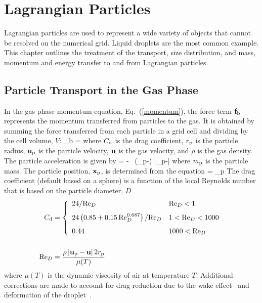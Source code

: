 

\chapter{Lagrangian Particles}
\label{chapter:lagrangian_particles}

Lagrangian particles are used to represent a wide variety of objects that cannot be resolved on
the numerical grid. Liquid droplets are the most common example. This chapter outlines the treatment of the transport, size
distribution, and mass, momentum and energy transfer to and from Lagrangian particles.

\section{Particle Transport in the Gas Phase}

In the gas phase momentum equation, Eq.~(\ref{momentum}), the force term ${\mathbf{f}}_{\rm b}$ represents the momentum transferred from particles to the gas.
It is obtained by summing the force transferred from each particle
in a grid cell and dividing by the cell volume, $V$:
\be
    {\bof_{\rm b}} =  \sum {}
\ee
where $C_{\rm d}$ is the drag coefficient, $r_{\rm p}$ is the particle radius, ${\mathbf{u}}_{\rm p}$ is the particle velocity, ${\mathbf{u}}$ is the
gas velocity, and $\rho$ is the gas density. The particle acceleration is given by
\be
     = \bg - \ha {} \,
    (\bu_{\rm p}-\bu) |\bu_{\rm p}-\bu|
\ee
where $m_{\rm p}$ is the particle mass.  The particle position, ${\mathbf{x}}_{\rm p}$, is determined from the equation
\be
     = \bu_{\rm p}
\ee
The drag coefficient (default based on a sphere) is a function of the local Reynolds number that is based on the particle diameter, $D$
\begin{align}
 C_{\rm d} &= \left\{ \begin{array}{ll}
     24/\hbox{Re}_D                                          & \hbox{Re}_D < 1    \\[0.1in]
     24\left(0.85+0.15 \, \hbox{Re}_D^{0.687} \right)/\hbox{Re}_D  & 1 < \hbox{Re}_D < 1000 \\[0.1in]
     0.44                                              & 1000 < \hbox{Re}_D
     \end{array} \right.  \\[0.2in]
\hbox{Re}_D &= \frac{\rho \, |{\mathbf{u}}_{\rm p}-{\mathbf{u}}| \, 2 r_{\rm p}}{\mu(T)} \end{align}
where $\mu(T)$ is the dynamic viscosity of air at temperature $T$. Additional corrections are made to account for drag reduction due to the wake effect~\cite{Ramirez:1} and deformation of the droplet~\cite{Loth:1}.


